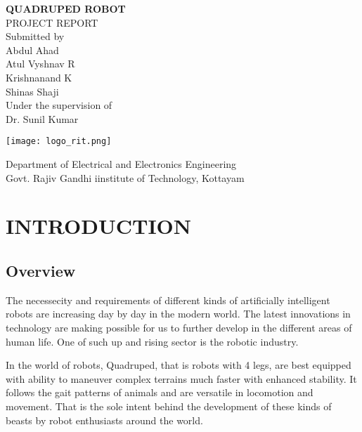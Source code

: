 \documentclass[12pt,a4paper]{report}
\begin{document}
\begin{center}
{\Huge \textbf{QUADRUPED ROBOT}}\\

\vspace{0.5cm}
\Large PROJECT REPORT\\

\vspace{0.5cm}
Submitted by\\
\vspace{0.5cm}
\large Abdul Ahad\\
\large Atul Vyshnav R\\
\large Krishnanand K\\ 
\large Shinas Shaji\\
\vspace{0.5cm}
Under the supervision of\\
\large Dr. Sunil Kumar\\
\vspace{0.5cm}

\texttt{[image: logo\_rit.png]}

\Large Department of Electrical and Electronics Engineering\\

\Large Govt. Rajiv Gandhi iinstitute of Technology, Kottayam\\
\end{center}
\newpage
\chapter{INTRODUCTION}
\section{Overview}

The necessecity and requirements of different kinds of artificially intelligent robots are increasing day by
day in the modern world. The latest innovations in technology are making possible for us to further develop
in the different areas of human life. One of such up and rising sector is the robotic industry. 

In the world of robots, Quadruped, that is robots with 4 legs, are best equipped with ability to maneuver complex terrains much faster with enhanced stability. It follows the gait patterns of animals and are versatile in locomotion and movement. That is the sole intent behind the development of these kinds of beasts by robot enthusiasts around the world.
\end{document}
